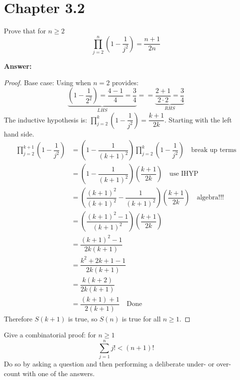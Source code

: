 \documentclass{article}
\begin{document}
\section{Chapter 3.2}
\setcounter{problem}{2}
\begin{problem} %
Prove that for $n \ge 2$
\begin{equation*}
    \prod_{j=2}^{n} \left (1 - \dfrac{1}{j^2} \right ) = \dfrac{n+1}{2n}
\end{equation*}
\end{problem}

\textbf{Answer:}
\begin{proof}
    Base case: Using when $n = 2$ provides:
    \begin{equation*}
        \underbrace{\left (1 - \dfrac{1}{2^2} \right ) = \dfrac{4-1}{4} = \dfrac{3}{4}}_{LHS} == \underbrace{\dfrac{2+1}{2 \cdot 2} = \dfrac{3}{4}}_{RHS}
    \end{equation*}
    The inductive hypothesis is: $\prod_{j=2}^{k} \left (1 - \dfrac{1}{j^2} \right ) = \dfrac{k+1}{2k}$. Starting with the left hand side.
    \begin{align*}
        \prod_{j=2}^{k+1} \left (1 - \dfrac{1}{j^2} \right ) &= \left (1 - \dfrac{1}{(k+1)^2} \right ) \prod_{j=2}^{k} \left (1 - \dfrac{1}{j^2} \right ) \quad \text{break up terms}  \\
        & = \left (1 - \dfrac{1}{(k+1)^2} \right ) \left ( \dfrac{k+1}{2k} \right ) \quad \text{use IHYP}\\
        & = \left (\dfrac{(k+1)^2}{(k+1)^2} - \dfrac{1}{(k+1)^2} \right ) \left ( \dfrac{k+1}{2k} \right ) \quad \text{algebra!!!}\\
        & = \left (\dfrac{(k+1)^2 - 1}{(k+1)^2} \right ) \left ( \dfrac{k+1}{2k} \right ) \\
        & = \dfrac{(k+1)^2 - 1}{2k(k+1)} \\
        & = \dfrac{k^2 + 2k + 1 - 1}{2k(k+1)} \\
        & = \dfrac{k(k+2)}{2k(k+1)} \\
        & = \dfrac{(k+1)+1}{2(k+1)} \quad \text{Done}
    \end{align*}
Therefore $S(k+1)$ is true, so $S(n)$ is true for all $n \ge 1$.
\end{proof}

\setcounter{problem}{6}
\begin{problem} %
Give a combinatorial proof: for $n \ge 1$
\begin{equation*}
    \sum_{j=1}^{n} j! < (n+1)!
\end{equation*}
Do so by asking a question and then performing a deliberate under- or over- count with one of the answers.
\end{problem}
\end{document}
